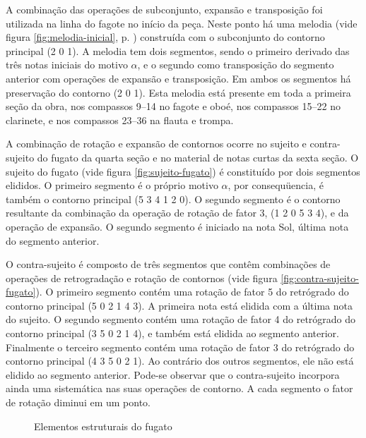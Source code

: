 A combinação das operações de subconjunto, expansão e transposição foi
utilizada na linha do fagote no início da peça. Neste ponto há uma
melodia (vide figura \ref{fig:melodia-inicial},
p. \pageref{fig:melodia-inicial}) construída com o subconjunto do
contorno principal (2 0 1). A melodia tem dois segmentos, sendo o
primeiro derivado das três notas iniciais do motivo $\alpha$, e o
segundo como transposição do segmento anterior com operações de
expansão e transposição. Em ambos os segmentos há preservação do
contorno (2 0 1). Esta melodia está presente em toda a primeira seção
da obra, nos compassos 9--14 no fagote e oboé, nos compassos 15--22 no
clarinete, e nos compassos 23--36 na flauta e trompa.

A combinação de rotação e expansão de contornos ocorre no sujeito e
contra-sujeito do fugato da quarta seção e no material de notas curtas
da sexta seção. O sujeito do fugato (vide figura
\ref{fig:sujeito-fugato}) é constituído por dois segmentos elididos. O
primeiro segmento é o próprio motivo $\alpha$, por consequüencia, é
também o contorno principal (5 3 4 1 2 0). O segundo segmento é o
contorno resultante da combinação da operação de rotação de fator 3,
(1 2 0 5 3 4), e da operação de expansão. O segundo segmento é
iniciado na nota Sol, última nota do segmento anterior.

O contra-sujeito é composto de três segmentos que contêm combinações
de operações de retrogradação e rotação de contornos (vide figura
\ref{fig:contra-sujeito-fugato}). O primeiro segmento contém uma
rotação de fator 5 do retrógrado do contorno principal (5 0 2 1 4
3). A primeira nota está elidida com a última nota do sujeito. O
segundo segmento contém uma rotação de fator 4 do retrógrado do
contorno principal (3 5 0 2 1 4), e também está elidida ao segmento
anterior. Finalmente o terceiro segmento contém uma rotação de fator 3
do retrógrado do contorno principal (4 3 5 0 2 1). Ao contrário dos
outros segmentos, ele não está elidido ao segmento anterior. Pode-se
observar que o contra-sujeito incorpora ainda uma sistemática nas suas
operações de contorno. A cada segmento o fator de rotação diminui em
um ponto.

\begin{figure}
  \centering

  \caption{Elementos estruturais do fugato}
  \label{fig:elementos-fugato}
\end{figure}

